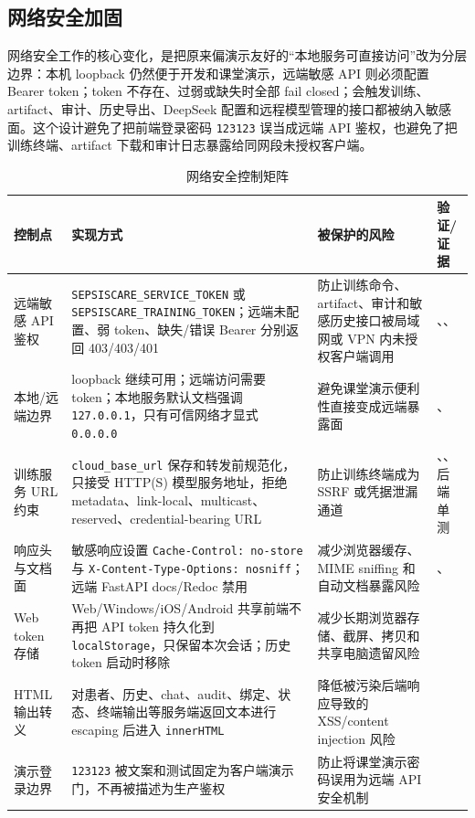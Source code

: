 \documentclass[11pt,a4paper]{article}
\begin{document}
\subsection{网络安全加固}
网络安全工作的核心变化，是把原来偏演示友好的“本地服务可直接访问”改为分层边界：本机 loopback 仍然便于开发和课堂演示，远端敏感 API 则必须配置 Bearer token；token 不存在、过弱或缺失时全部 fail closed；会触发训练、artifact、审计、历史导出、DeepSeek 配置和远程模型管理的接口都被纳入敏感面。这个设计避免了把前端登录密码 \texttt{123123} 误当成远端 API 鉴权，也避免了把训练终端、artifact 下载和审计日志暴露给同网段未授权客户端。

\begin{table}[H]
\centering
\caption{网络安全控制矩阵}
\label{tab:network-security-controls}
\scriptsize
\setlength{\tabcolsep}{3pt}
\renewcommand{\arraystretch}{1.14}
\begin{tabularx}{\textwidth}{@{}l Y Y Y@{}}
\toprule
控制点 & 实现方式 & 被保护的风险 & 验证/证据\\
\midrule
远端敏感 API 鉴权 & \texttt{SEPSISCARE\_SERVICE\_TOKEN} 或 \texttt{SEPSISCARE\_TRAINING\_TOKEN}；远端未配置、弱 token、缺失/错误 Bearer 分别返回 403/403/401 & 防止训练命令、artifact、审计和敏感历史接口被局域网或 VPN 内未授权客户端调用 & 、、\\
本地/远端边界 & loopback 继续可用；远端访问需要 token；本地服务默认文档强调 \texttt{127.0.0.1}，只有可信网络才显式 \texttt{0.0.0.0} & 避免课堂演示便利性直接变成远端暴露面 & 、\\
训练服务 URL 约束 & \texttt{cloud\_base\_url} 保存和转发前规范化，只接受 HTTP(S) 模型服务地址，拒绝 metadata、link-local、multicast、reserved、credential-bearing URL & 防止训练终端成为 SSRF 或凭据泄漏通道 & 、、后端单测\\
响应头与文档面 & 敏感响应设置 \texttt{Cache-Control: no-store} 与 \texttt{X-Content-Type-Options: nosniff}；远端 FastAPI docs/Redoc 禁用 & 减少浏览器缓存、MIME sniffing 和自动文档暴露风险 & 、\\
Web token 存储 & Web/Windows/iOS/Android 共享前端不再把 API token 持久化到 \texttt{localStorage}，只保留本次会话；历史 token 启动时移除 & 减少长期浏览器存储、截屏、拷贝和共享电脑遗留风险 & \\
HTML 输出转义 & 对患者、历史、chat、audit、绑定、状态、终端输出等服务端返回文本进行 escaping 后进入 \texttt{innerHTML} & 降低被污染后端响应导致的 XSS/content injection 风险 & \\
演示登录边界 & \texttt{123123} 被文案和测试固定为客户端演示门，不再被描述为生产鉴权 & 防止将课堂演示密码误用为远端 API 安全机制 & \\
\bottomrule
\end{tabularx}
\end{table}
\end{document}
